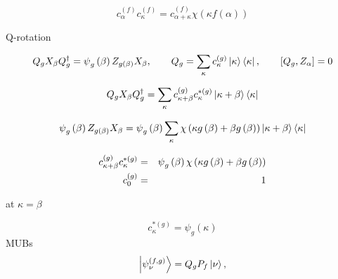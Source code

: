 \documentclass{article}
\begin{document}
\begin{equation*}
c_{\alpha }^{\left( f\right) }c_{\kappa }^{\left( f\right) }=c_{\alpha
+\kappa }^{\left( f\right) }\chi \left( \kappa f\left( \alpha \right)
\right) 
\end{equation*}

Q-rotation

\begin{equation*}
Q_{g}X_{\beta }Q_{g}^{\dag }=\psi _{g}\left( \beta \right) Z_{g\left( \beta
\right) }X_{\beta },\qquad Q_{g}=\dsum\limits_{\kappa }c_{\kappa }^{\left(
g\right) }\left\vert \kappa \right\rangle \left\langle \kappa \right\vert
,\qquad \left[ Q_{g},Z_{\alpha }\right] =0 
\end{equation*}

\begin{equation*}
Q_{g}X_{\beta }Q_{g}^{\dag }=\dsum\limits_{\kappa }c_{\kappa +\beta
}^{\left( g\right) }c_{\kappa }^{\ast \left( g\right) }\left\vert \kappa
+\beta \right\rangle \left\langle \kappa \right\vert 
\end{equation*}

\begin{equation*}
\psi _{g}\left( \beta \right) Z_{g\left( \beta \right) }X_{\beta }=\psi
_{g}\left( \beta \right) \dsum\limits_{\kappa }\chi \left( \kappa g\left(
\beta \right) +\beta g\left( \beta \right) \right) \left\vert \kappa +\beta
\right\rangle \left\langle \kappa \right\vert 
\end{equation*}

\begin{eqnarray}
c_{\kappa +\beta }^{\left( g\right) }c_{\kappa }^{\ast \left( g\right) }
&=&\psi _{g}\left( \beta \right) \chi \left( \kappa g\left( \beta \right)
+\beta g\left( \beta \right) \right)  \notag \\
c_{0}^{\left( g\right) } &=&1
\end{eqnarray}

at $\kappa =\beta $

\begin{equation*}
c_{\kappa }^{\ast \left( g\right) }=\psi _{g}\left( \kappa \right) 
\end{equation*}%
MUBs 
\begin{equation}
\left\vert \psi _{\nu }^{\left( f,g\right) }\right\rangle
=Q_{g}P_{f}\left\vert \nu \right\rangle ,  \notag
\end{equation}
\end{document}
